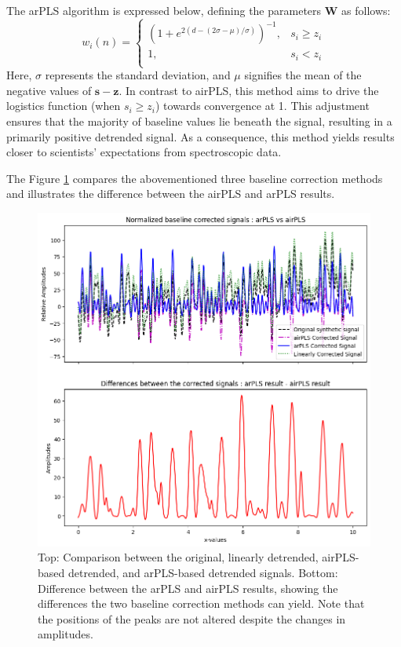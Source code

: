 \documentclass{article}
\begin{document}
The arPLS algorithm is expressed below, defining the parameters $\mathbf{W}$ as follows:
\begin{equation*}
    w_i(n) = \begin{cases}
        \left(1+ e^{2(d - (2 \sigma - \mu)/\sigma)}\right)^{-1}, &  s_i \geq z_i \\
        1, &  s_i < z_i\\
    \end{cases}
\end{equation*}
Here, $\sigma$ represents the standard deviation, and $\mu$ signifies the mean of the negative values of $\mathbf{s}-\mathbf{z}$.
In contrast to airPLS, this method aims to drive the logistics function (when $s_i \geq z_i$) towards convergence at 1.
This adjustment ensures that the majority of baseline values lie beneath the signal, resulting in a primarily positive detrended signal.
As a consequence, this method yields results closer to scientists' expectations from spectroscopic data.


The Figure \ref{fig:detrending} compares the abovementioned three baseline correction methods and illustrates the difference between the airPLS and arPLS results.
\begin{figure}[hbt!]
    \includegraphics[width=\linewidth]{detrending_plots.png}
    \caption{Top: Comparison between the original, linearly detrended, airPLS-based detrended, and arPLS-based detrended signals. Bottom: Difference between the arPLS and airPLS results, showing the differences the two baseline correction methods can yield. Note that the positions of the peaks are not altered despite the changes in amplitudes. }
    \label{fig:detrending}
\end{figure}
%
%
\end{document}
